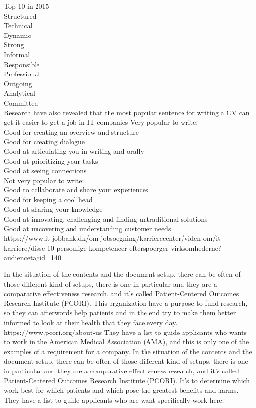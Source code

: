 Top 10 in 2015 \\

Structured \\
Technical \\
Dynamic \\
Strong \\
Informal \\
Responsible \\
Professional \\
Outgoing \\
Analytical \\
Committed \\

Research have also revealed that the most popular sentence for writing a CV can get it easier to get a job in IT-companies
Very popular to write:\\

Good for creating an overview and structure \\
Good for creating dialogue\\
Good at articulating you in writing and orally \\
Good at prioritizing your tasks \\
Good at seeing connections \\

Not very popular to write: \\

Good to collaborate and share your experiences \\
Good for keeping a cool head \\
Good at sharing your knowledge \\
Good at innovating, challenging and finding untraditional solutions \\
Good at uncovering and understanding customer needs \\
https://www.it-jobbank.dk/om-jobsoegning/karrierecenter/viden-om/it-karriere/disse-10-personlige-kompetencer-efterspoerger-virksomhederne?audiencetagid=140

In the situation of the contents and the document setup, there can be often of those different kind of setups, 
there is one in particular and they are a comparative effectiveness research, and it's called 
Patient-Centered Outcomes Research Institute (PCORI). 
This organization have a purpose to fund research, so they can afterwords help patients and in the end try to make them better
informed to look at their health that they face every day.
https://www.pcori.org/about-us
They have a list to guide applicants who wants to work in the American Medical Association (AMA),
and this is only one of the examples of a requirement for a company.
In the situation of the contents and the document setup, there can be often of those different kind of setups,
there is one in particular and they are a comparative effectiveness research, and it's called
Patient-Centered Outcomes Research Institute (PCORI).
It's to determine which work best for which patients and which pose the greatest benefits and harms. %
They have a list to guide applicants who are want specifically work here: \\

